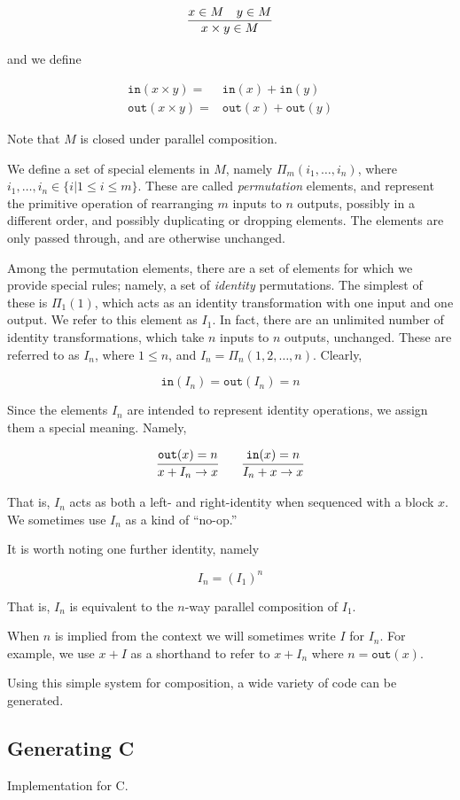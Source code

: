 \[
\infer
  {x \times y \in M}
  {x \in M \quad y \in M}
\]

and we define

\begin{eqnarray*}
\mathtt{in} (x \times y) =& \mathtt{in}(x)  + \mathtt{in}(y)\\ 
\mathtt{out}(x
\times y) =& \mathtt{out}(x) + \mathtt{out}(y) \end{eqnarray*}

Note that $M$ is closed under parallel composition.

We define a set of special elements in $M$, namely $\Pi_m(i_1,\ldots,i_n)$, where $i_1,\ldots,i_n \in \lbrace i | 1 \leq i \leq m \rbrace$. These are called \emph{permutation} elements, and represent the primitive operation of rearranging $m$ inputs to $n$ outputs, possibly in a different order, and possibly duplicating or dropping elements. The elements are only passed through, and are otherwise unchanged.

Among the permutation elements, there are a set of elements for which we provide special rules; namely, a set of \emph{identity} permutations. The simplest of these is $\Pi_1(1)$, which acts as an identity transformation with one input and one output. We refer to this element as $I_1$. In fact, there are an unlimited number of identity transformations, which take $n$ inputs to $n$ outputs, unchanged. These are referred to as $I_n$, where $1 \leq n$, and $I_n = \Pi_n(1,2,\ldots,n)$. Clearly,

\[
\mathtt{in}(I_n) = \mathtt{out}(I_n) = n
\]

Since the elements $I_n$ are intended to represent identity operations, we assign them a special meaning. Namely,

\[
\infer{x + I_n \to x}{\mathtt{out}(x) = n} 
\qquad
\infer{I_n + x \to x}{\mathtt{in}(x) = n}
\]

That is, $I_n$ acts as both a left- and right-identity when sequenced with a block $x$. We sometimes use $I_n$ as a kind of ``no-op.''

It is worth noting one further identity, namely

\[
I_n = (I_1)^n
\]

That is, $I_n$ is equivalent to the $n$-way parallel composition of $I_1$.

When $n$ is implied from the context we will sometimes write $I$ for $I_n$. For example, we use $x+I$ as a shorthand to refer to $x+I_n$ where $n = \mathtt{out}(x)$.

Using this simple system for composition, a wide variety of code can be generated.

\subsection{Generating C}
\label{sec:code-gen:c}

Implementation for C.
